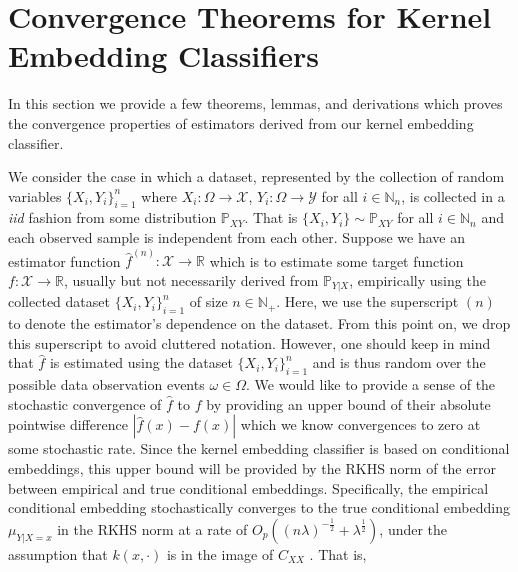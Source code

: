 \documentclass{article}
\begin{document}
%		




\newpage
\appendix
	
\section{Convergence Theorems for Kernel Embedding Classifiers}
\label{app:convergence_theorems}

	In this section we provide a few theorems, lemmas, and derivations which proves the convergence properties of estimators derived from our kernel embedding classifier.
	
	We consider the case in which a dataset, represented by the collection of random variables $\{X_{i}, Y_{i}\}_{i = 1}^{n}$ where $X_{i} : \Omega \to \mathcal{X}$,  $Y_{i} : \Omega \to \mathcal{Y}$ for all $i \in \mathbb{N}_{n}$, is collected in a \textit{iid} fashion from some distribution $\mathbb{P}_{X Y}$. That is $\{X_{i}, Y_{i}\} \sim \mathbb{P}_{X Y}$ for all $i \in \mathbb{N}_{n}$ and each observed sample is independent from each other. Suppose we have an estimator function $\hat{f}^{(n)} : \mathcal{X} \to \mathbb{R}$ which is to estimate some target function  $f : \mathcal{X} \to \mathbb{R}$, usually but not necessarily derived from $\mathbb{P}_{Y |X }$, empirically using the collected dataset $\{X_{i}, Y_{i}\}_{i = 1}^{n}$ of size $n \in \mathbb{N}_{+}$. Here, we use the superscript $(n)$ to denote the estimator's dependence on the dataset. From this point on, we drop this superscript to avoid cluttered notation. However, one should keep in mind that $\hat{f}$ is estimated using the dataset $\{X_{i}, Y_{i}\}_{i = 1}^{n}$ and is thus random over the possible data observation events $\omega \in \Omega$. We would like to provide a sense of the stochastic convergence of $\hat{f}$ to $f$ by providing an upper bound of their absolute pointwise difference $| \hat{f}(x) - f(x) |$ which we know convergences to zero at some stochastic rate. Since the kernel embedding classifier is based on conditional embeddings, this upper bound will be provided by the RKHS norm of the error between empirical and true conditional embeddings. Specifically, the empirical conditional embedding stochastically converges to the true conditional embedding $\mu_{Y | X = x}$ in the RKHS norm at a rate of $O_{p}((n \lambda)^{-\frac{1}{2}} + \lambda^{\frac{1}{2}})$, under the assumption that $k(x, \cdot)$ is in the image of $C_{XX}$ \cite[Theorem 6]{song2009hilbert}. That is,
	
\end{document}
